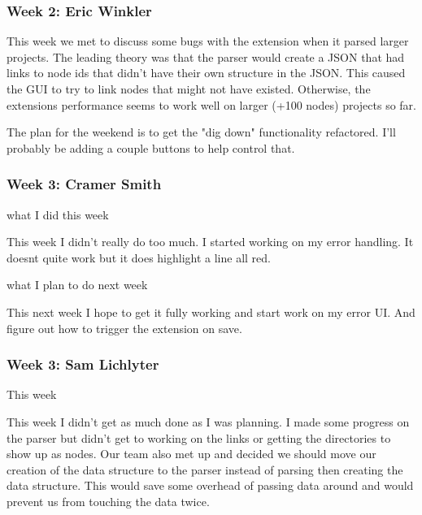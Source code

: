  \subsubsection{Week 2: Eric Winkler}

This week we met to discuss some bugs with the extension when it parsed larger projects. The leading theory was that the parser would create a JSON that had links to node ids that didn't have their own structure in the JSON. This caused the GUI to try to link nodes that might not have existed. Otherwise, the extensions performance seems to work well on larger (+100 nodes) projects so far.



The plan for the weekend is to get the "dig down" functionality refactored. I'll probably be adding a couple buttons to help control that. \\ 

 \subsubsection{Week 3: Cramer Smith}

what I did this week



This week I didn't really do too much. I started working on my error handling. It doesnt quite work but it does highlight a line all red.



what I plan to do next week 



This next week I hope to get it fully working and start work on my error UI. And figure out how to trigger the extension on save. \\ 

 \subsubsection{Week 3: Sam Lichlyter}

This week

This week I didn't get as much done as I was planning. I made some progress on the parser but didn't get to working on the links or getting the directories to show up as nodes. Our team also met up and decided we should move our creation of the data structure to the parser instead of parsing then creating the data structure. This would save some overhead of passing data around and would prevent us from touching the data twice.



